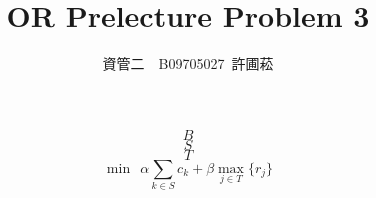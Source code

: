 \documentclass{article}
\title{OR Prelecture Problem 3}
\date{}
\author{資管二\ \ B09705027\  許圃菘}
\begin{document}
\begin{CJK*}{UTF8}{bsmi}
    \maketitle
    $$B$$
    $$S$$
    $$T$$
    $$\min \ \ \alpha\sum\limits_{k \in S}c_k + \beta \max\limits_{j \in T}\{ r_j\}$$
\end{CJK*}
\end{document}
